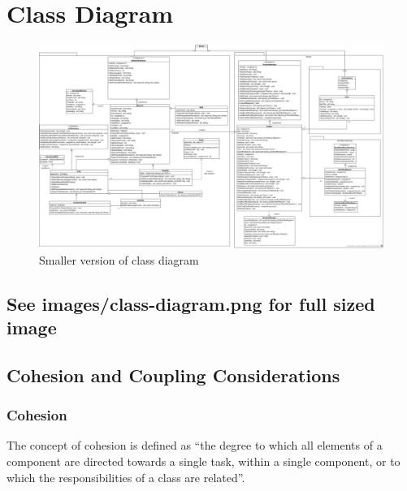 \documentclass[
  english,
  a4paper,
,tablecaptionabove
]{scrartcl}
\begin{document}
\newpage

\hypertarget{class-diagram}{%
\section{Class Diagram}\label{class-diagram}}

\begin{figure}
\centering
\includegraphics{images/class-diagrams/class-diagram-models.jpg}
\caption{Smaller version of class diagram}
\end{figure}

\hypertarget{see-imagesclass-diagram.png-for-full-sized-image}{%
\subsection{See images/class-diagram.png for full sized
image}\label{see-imagesclass-diagram.png-for-full-sized-image}}

\newpage

\hypertarget{cohesion-and-coupling-considerations}{%
\subsection{Cohesion and Coupling
Considerations}\label{cohesion-and-coupling-considerations}}

\hypertarget{cohesion}{%
\subsubsection{Cohesion}\label{cohesion}}

The concept of cohesion is defined as \enquote{the degree to which all
elements of a component are directed towards a single task, within a
single component, or to which the responsibilities of a class are
related}.
\end{document}
